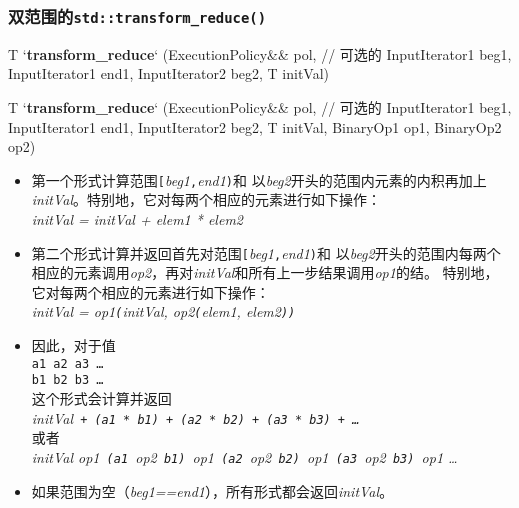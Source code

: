 \subsubsection{双范围的\texttt{std::transform\_reduce()}}\label{ch23.2.2.2}
\begin{blacklisting}
T
`\textbf{transform\_reduce}` (ExecutionPolicy&& pol,    // 可选的
                  InputIterator1 beg1, InputIterator1 end1,
                  InputIterator2 beg2,
                  T initVal)

T
`\textbf{transform\_reduce}` (ExecutionPolicy&& pol,    // 可选的
                  InputIterator1 beg1, InputIterator1 end1,
                  InputIterator2 beg2,
                  T initVal,
                  BinaryOp1 op1, BinaryOp2 op2)
\end{blacklisting}
\begin{itemize}
    \item 第一个形式计算范围\texttt{[}\emph{beg1}\texttt{,}\emph{end1}\texttt{)}和
    以\emph{beg2}开头的范围内元素的内积再加上\emph{initVal}。特别地，它对每两个相应的元素进行如下操作：\\
    \hspace*{2em}\emph{initVal = initVal + elem1 * elem2}
    \item 第二个形式计算并返回首先对范围\texttt{[}\emph{beg1}\texttt{,}\emph{end1}\texttt{)}和
    以\emph{beg2}开头的范围内每两个相应的元素调用\emph{op2}，再对\emph{initVal}和所有上一步结果调用\emph{op1}的结。
    特别地，它对每两个相应的元素进行如下操作：\\
    \hspace*{2em}\emph{initVal = op1\texttt{(}initVal, op2\texttt{(}elem1, elem2\texttt{))}}
    \item 因此，对于值\\
    \hspace*{2em}\texttt{a1 a2 a3 \ldots}\\
    \hspace*{2em}\texttt{b1 b2 b3 \ldots}\\
    这个形式会计算并返回\\
    \hspace*{2em}\emph{initVal\texttt{ + (a1 * b1) + (a2 * b2) + (a3 * b3) + \ldots}}\\
    或者\\
    \hspace*{2em}\emph{initVal op1\texttt{ (a1 }op2\texttt{ b1) }op1\texttt{ (a2 }op2\texttt{ b2) }op1\texttt{ (a3 }op2\texttt{ b3) }op1 \ldots}
    \item 如果范围为空（\emph{beg1==end1}），所有形式都会返回\emph{initVal}。

\end{itemize}

